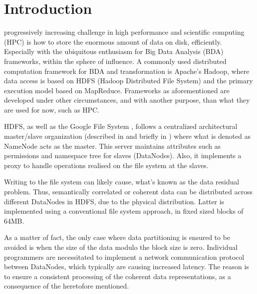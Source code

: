 \chapter{Introduction} \label{chap:introduction}

 progressively increasing challenge in high performance and scientific computing (HPC) is how to store the enormous amount of data on disk, efficiently. Especially with the ubiquitous enthusiasm for Big Data Analysis (BDA) frameworks, within the sphere of influence. A commonly used distributed computation framework for BDA and transformation is Apache's Hadoop\cite{PageHadoop}, where data access is based on HDFS (Hadoop Distributed File System) \cite{Shvachko:2010:HDF:1913798.1914427} and the primary execution model based on MapReduce\cite{Dean:2008:MSD:1327452.1327492}. Frameworks as aforementioned are developed under other circumstances, and with another purpose, than what they are used for now, such as HPC. 
\newline

HDFS, as well as the Google File System \cite{Ghemawat:2003:GFS:945445.945450}, follows a centralized architectural master/slave organization (described in \eg \cite{Tanenbaum:2006:DSP:1202502} and briefly in \cite{Wilkinson:1998:PPT:289352}) where what is denoted as NameNode acts as the master. This server maintains attributes such as permissions and namespace tree for slaves (DataNodes). Also, it implements a proxy to handle operations realised on the file system at the slaves. 
\newline

Writing to the file system can likely cause, what's known as the data residual problem. Thus, semantically correlated or coherent data can be distributed across different DataNodes in HDFS, due to the physical distribution. Latter is implemented using a conventional file system approach, \ie in fixed sized blocks of 64MB. 
\newpage

As a matter of fact, the only case where data partitioning is ensured to be avoided is when the size of the data modulo the block size is zero. Individual programmers are necessitated to implement a network communication protocol between DataNodes, which typically are causing increased latency. The reason is to ensure a consistent processing of the coherent data representations, as a consequence of the heretofore mentioned.
\newline


